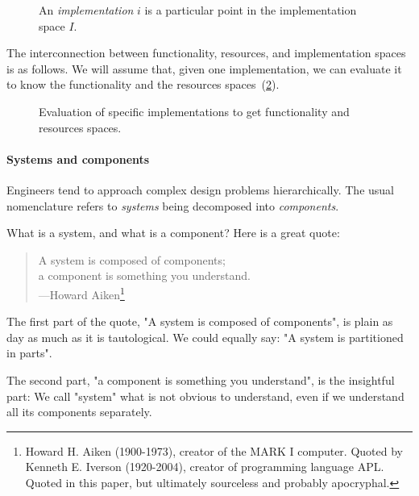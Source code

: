 \begin{figure}[h!]
    \begin{center}
    \end{center}
    \caption{An \emph{implementation} $i$ is a particular point in the implementation space $I$.}
    \label{fig:impspace}
\end{figure}


The interconnection between functionality, resources, and implementation spaces
is as follows. We will assume that, given one implementation, we can evaluate it
to know the functionality and the resources spaces~(\cref{fig:FIR}).

\begin{figure}[h!]
    \centering
    \caption{Evaluation of specific implementations to get functionality and resources spaces.\label{fig:FIR}}
\end{figure}

\paragraph{Systems and components}

Engineers tend to approach complex design problems hierarchically.  The usual
nomenclature refers to \textit{systems} being decomposed into \textit{components}.

\noindent What is a system, and what is a component? Here is a great quote:

\begin{quote}
A system is composed of components; \\
a component is something you understand.\\
---Howard Aiken\footnote{
Howard H. Aiken (1900-1973), creator of the MARK I computer.
Quoted by Kenneth E. Iverson (1920-2004), creator of programming language APL.
Quoted in this paper\cite{that-paper},
  but ultimately sourceless and probably apocryphal.}
\end{quote}

The first part of the quote, "A system is composed of components", is plain as day as much as
it is tautological. We could equally say: "A system is partitioned in parts".

The second part, "a component is something you understand", is the insightful part: We call
"system" what is not obvious to understand, even if we understand all its components
separately.

